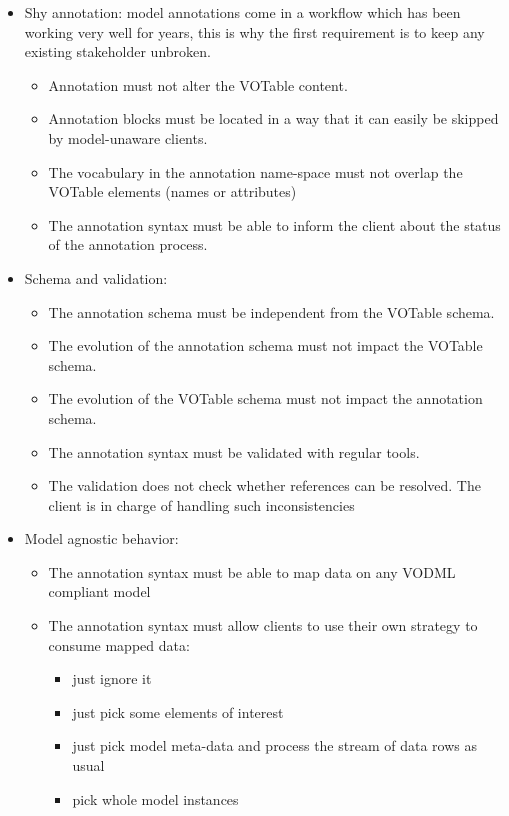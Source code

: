 \begin {itemize}
  \item Shy annotation: model annotations come in a workflow which has been working very well for years, this is why the first requirement is to keep any existing stakeholder unbroken.
  \begin {itemize}
    \item Annotation must not alter the VOTable content.
    \item Annotation blocks must be located in a way that it can easily be skipped by model-unaware clients.
    \item The vocabulary in the annotation name-space must not overlap the VOTable elements (names or attributes)    
    \item The annotation syntax must be able to inform the client about the status of the annotation process.
  \end {itemize}
  
  \item Schema and validation:
  \begin {itemize}
    \item The annotation schema must be independent from the VOTable schema.
    \item The evolution of the annotation schema must not impact the VOTable schema.
    \item The evolution of the VOTable schema must not impact the annotation schema.
    \item The annotation syntax must be validated with regular tools.
    \item The validation does not check whether references can be resolved. The client is in charge of handling such inconsistencies
  \end {itemize}
  
  \item Model agnostic behavior:
  \begin {itemize}
    \item The annotation syntax must be able to map data on any VODML compliant model
    \item The annotation syntax must allow clients to use their own strategy to consume mapped data:
      \begin {itemize}
        \item just ignore it
        \item just pick some elements of interest 
        \item just pick model meta-data and process the stream of data rows as usual
        \item pick whole model instances
      \end {itemize}
  \end {itemize}
  

\end{itemize}
